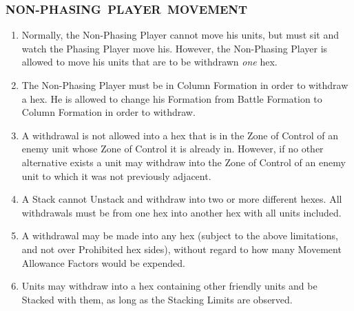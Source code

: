 \subsubsection{\mbox{\small NON-PHASING PLAYER MOVEMENT}}

\begin{enumerate}
  \item Normally, the Non-Phasing Player cannot move his units, but must sit and watch the Phasing Player move his. However, the Non-Phasing Player is allowed to move his units that are to be withdrawn \textit{one} hex.

  \item The Non-Phasing Player must be in Column Formation in order to withdraw a hex. He is allowed to change his Formation from Battle Formation to Column Formation in order to withdraw.

  \item A withdrawal is not allowed into a hex that is in the Zone of Control of an enemy unit whose Zone of Control it is already in. However, if no other alternative exists a unit may withdraw into the Zone of Control of an enemy unit to which it was not previously adjacent.

  \item A Stack cannot Unstack and withdraw into two or more different hexes. All withdrawals must be from one hex into another hex with all units included.

  \item A withdrawal may be made into any hex (subject to the above limitations, and not over Prohibited hex sides), without regard to how many Movement Allowance Factors would be expended.

  \item Units may withdraw into a hex containing other friendly units and be Stacked with them, as long as the Stacking Limits are observed.
\end{enumerate}
